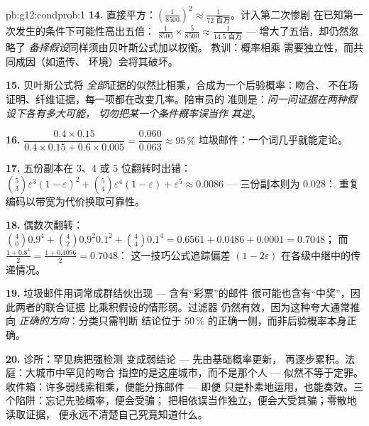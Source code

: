 \begin{solution}{pb:g12:condprob:1}
\textbf{14.} 直接平方：$\left(\frac{1}{8500}\right)^2
\approx \frac{1}{72 \text{ 百万}}$。计入第二次惨剧
在已知第一次发生的条件下可能性高出五倍：
$\frac{1}{8500} \times \frac{5}{8500} \approx
\frac{1}{14.5 \text{ 百万}}$ --- 增大了五倍，却仍然忽略了
\emph{备择假设}同样须由贝叶斯公式加以权衡。
教训：概率相乘
需要独立性，而共同成因（如遗传、
环境）会将其破坏。

\textbf{15.} 贝叶斯公式将
\emph{全部}证据的似然比相乘，合成为一个后验概率：吻合、
不在场证明、纤维证据，每一项都在改变几率。陪审员的
准则是：\emph{问一问证据在两种假设下各有多大可能，
切勿把某一个条件概率误当作
其逆}。

\textbf{16.} $\dfrac{0.4 \times 0.15}{0.4 \times 0.15 +
0.6 \times 0.005} = \dfrac{0.060}{0.063} \approx 95\,\%$
垃圾邮件：一个词几乎就能定论。

\textbf{17.} 五份副本在 $3$、$4$ 或 $5$ 位翻转时出错：
$\binom53 \varepsilon^3(1-\varepsilon)^2 + \binom54
\varepsilon^4 (1 - \varepsilon) + \varepsilon^5 \approx
0.0086$ --- 三份副本则为 $0.028$：
重复编码以带宽为代价换取可靠性。

\textbf{18.} 偶数次翻转：$\binom40 0.9^4 + \binom42 0.9^2
0.1^2 + \binom44 0.1^4 = 0.6561 + 0.0486 + 0.0001 = 0.7048$；
而 $\frac{1 + 0.8^4}{2} = \frac{1 + 0.4096}{2} = 0.7048$：
这一技巧公式追踪偏差 $(1 - 2\varepsilon)$
在各级中继中的传递情况。

\textbf{19.} 垃圾邮件用词常成群结伙出现 --- 含有“彩票”的邮件
很可能也含有“中奖”，因此两者的联合证据
比乘积假设的情形弱。过滤器
仍然有效，因为这种夸大通常推向
\emph{正确的方向}：分类只需判断
结论位于 $50\,\%$ 的正确一侧，而非后验概率本身正确。

\textbf{20.} 诊所：罕见病把强检测
变成弱结论 --- 先由基础概率更新，
再逐步累积。法庭：大城市中罕见的吻合
指控的是这座城市，而不是那个人 --- 似然不等于定罪。
收件箱：许多弱线索相乘，便能分拣邮件 --- 即便
只是朴素地运用，也能奏效。三个陷阱：忘记先验概率，便会受骗；
把相依误当作独立，便会大受其骗；零散地读取证据，
便永远不清楚自己究竟知道什么。
\end{solution}
